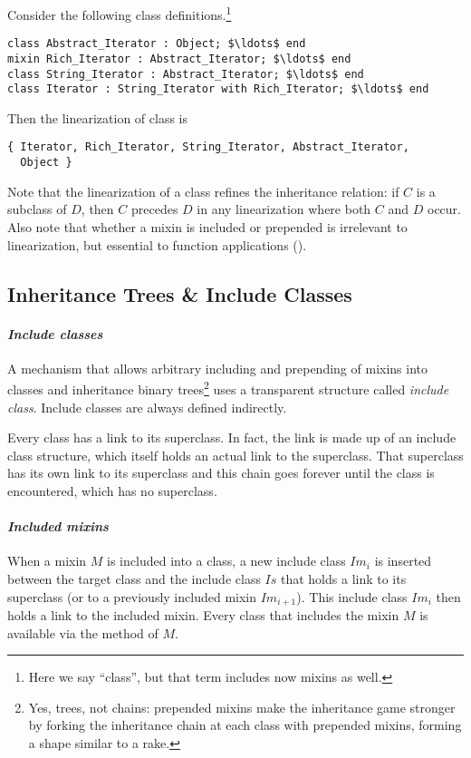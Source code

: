 \example Consider the following class definitions.\footnote{Here we say ``class'', but that term includes now mixins as well.}
\begin{lstlisting}
class Abstract_Iterator : Object; $\ldots$ end
mixin Rich_Iterator : Abstract_Iterator; $\ldots$ end
class String_Iterator : Abstract_Iterator; $\ldots$ end
class Iterator : String_Iterator with Rich_Iterator; $\ldots$ end
\end{lstlisting}
Then the linearization of class  is
\begin{lstlisting}
{ Iterator, Rich_Iterator, String_Iterator, Abstract_Iterator, 
  Object }
\end{lstlisting}

Note that the linearization of a class refines the inheritance relation: if $C$ is a subclass of $D$, then $C$ precedes $D$ in any linearization where both $C$ and $D$ occur. Also note that whether a mixin is included or prepended is irrelevant to linearization, but essential to function applications ().

\subsection{Inheritance Trees \& Include Classes}
\label{sec:inheritance-trees}
\label{sec:include-classes}

\paragraph{\em Include classes}
A mechanism that allows arbitrary including and prepending of mixins into classes and inheritance binary trees\footnote{Yes, trees, not chains: prepended mixins make the inheritance game stronger by forking the inheritance chain at each class with prepended mixins, forming a shape similar to a rake.} uses a transparent structure called {\em include class}. Include classes are always defined indirectly.

Every class has a link to its superclass. In fact, the link is made up of an include class structure, which itself holds an actual link to the superclass. That superclass has its own link to its superclass and this chain goes forever until the  class is encountered, which has no superclass. 

\paragraph{\em Included mixins}
When a mixin $M$ is included into a class, a new include class $Im_i$ is inserted between the target class and the include class $Is$ that holds a link to its superclass (or to a previously included mixin $Im_{i+1}$). This include class $Im_i$ then holds a link to the included mixin. Every class that includes the mixin $M$ is available via the  method of $M$. 

